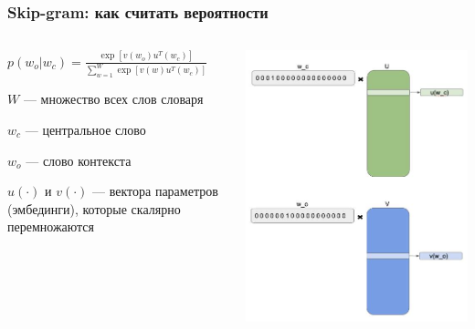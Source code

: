 \documentclass[fullscreen=true, bookmarks=true, hyperref={pdfencoding=unicode}]{beamer}
\begin{document}
\begin{frame}
  \frametitle{Skip-gram: как считать вероятности}

  \begin{columns}
      \begin{column}{.4\paperwidth}
        $ p(w_o|w_c) = \frac{\exp[v(w_o)u^T(w_c)]}{\sum\limits_{w=1}^W \exp[v(w)u^T(w_c)]}$

        $W$ — множество всех слов словаря

        $w_c$ — центральное слово

        $w_o$ — слово контекста

        $u(\cdot)$ и $v(\cdot)$ — вектора параметров (эмбединги), которые скалярно перемножаются
      \end{column}
      \begin{column}{.5\paperwidth}
        \begin{center}
          \includegraphics[keepaspectratio,
                           width=.5\paperwidth]{skip-gram-p.jpg}
        \end{center}
      \end{column}
  \end{columns}
\end{frame}
\end{document}
